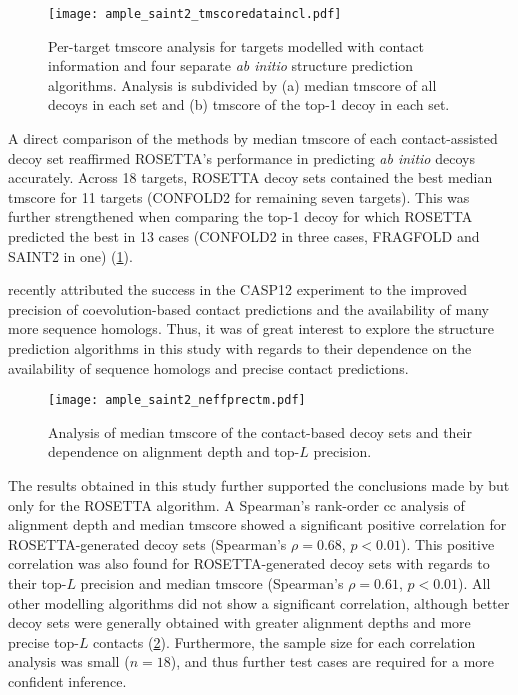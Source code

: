 \begin{figure}[H]
    \centering
    \texttt{[image: ample\_saint2\_tmscoredataincl.pdf]}
    \caption[TM-score analysis for four modelling algorithms with contacts]{Per-target \gls{tmscore} analysis for targets modelled with contact information and four separate \textit{ab initio} structure prediction algorithms. Analysis is subdivided by (a) median \gls{tmscore} of all decoys in each set and (b) \gls{tmscore} of the top-1 decoy in each set.}
    \label{fig:ample_saint2_tmscoredataincl}
\end{figure}

A direct comparison of the methods by median \gls{tmscore} of each contact-assisted decoy set reaffirmed ROSETTA's performance in predicting \textit{ab initio} decoys accurately. Across 18 targets, ROSETTA decoy sets contained the best median \gls{tmscore} for 11 targets (CONFOLD2 for remaining seven targets). This was further strengthened when comparing the top-1 decoy for which ROSETTA predicted the best in 13 cases (CONFOLD2 in three cases, FRAGFOLD and SAINT2 in one) (\cref{fig:ample_saint2_tmscoredataincl}).

\textcite{Abriata2018-lu} recently attributed the success in the CASP12 experiment to the improved precision of coevolution-based contact predictions and the availability of many more sequence homologs. Thus, it was of great interest to explore the structure prediction algorithms in this study with regards to their dependence on the availability of sequence homologs and precise contact predictions.

\begin{figure}[H]
    \centering
    \texttt{[image: ample\_saint2\_neffprectm.pdf]}
    \caption[Analysis of alignment depth, precision and TM-scores]{Analysis of median \gls{tmscore} of the contact-based decoy sets and their dependence on  alignment depth and top-$L$ precision.}
    \label{fig:ample_saint2_neffprectm}
\end{figure}

The results obtained in this study further supported the conclusions made by \textcite{Abriata2018-lu} but only for the ROSETTA algorithm. A Spearman's rank-order \gls{cc} analysis of alignment depth and median \gls{tmscore} showed a significant positive correlation for ROSETTA-generated decoy sets (Spearman's $\rho=0.68$, $p<0.01$). This positive correlation was also found for ROSETTA-generated decoy sets with regards to their top-$L$ precision and median \gls{tmscore} (Spearman's $\rho=0.61$, $p<0.01$). All other modelling algorithms did not show a significant correlation, although better decoy sets were generally obtained with greater alignment depths and more precise top-$L$ contacts (\cref{fig:ample_saint2_neffprectm}). Furthermore, the sample size for each correlation analysis was small ($n=18$), and thus further test cases are required for a more confident inference.


